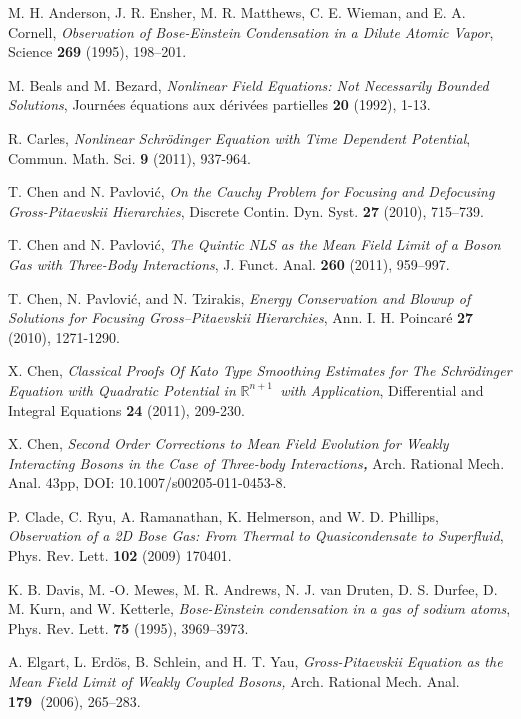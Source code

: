 \documentclass[reqno]{amsart}
\theoremstyle{plain}
\numberwithin{equation}{section}
\begin{document}
\begin{thebibliography}{99}
 M. H. Anderson, J. R. Ensher, M. R. Matthews, C. E.
Wieman, and E. A. Cornell, \emph{Observation of Bose-Einstein Condensation
in a Dilute Atomic Vapor}, Science \textbf{269 }(1995), 198--201.

 M. Beals and M. Bezard, \emph{Nonlinear Field
Equations: Not Necessarily Bounded Solutions}, Journ\'{e}es \'{e}quations
aux d\'{e}riv\'{e}es partielles \textbf{20} (1992), 1-13.

 R. Carles, \emph{Nonlinear Schr\"{o}dinger Equation with
Time Dependent Potential}, Commun. Math. Sci. \textbf{9} (2011), 937-964.

 T. Chen and N. Pavlovi\'{c}, \emph{On the Cauchy
Problem for Focusing and Defocusing Gross-Pitaevskii Hierarchies}, Discrete
Contin. Dyn. Syst. \textbf{27} (2010), 715--739.

 T. Chen and N. Pavlovi\'{c}, \emph{The Quintic NLS as
the Mean Field Limit of a Boson Gas with Three-Body Interactions}, J. Funct.
Anal. \textbf{260} (2011), 959--997.

 T. Chen, N. Pavlovi\'{c}, and N. Tzirakis, \emph{Energy
Conservation and Blowup of Solutions for Focusing Gross--Pitaevskii
Hierarchies}, Ann. I. H. Poincar\'{e} \textbf{27} (2010), 1271-1290.

 X. Chen, \emph{Classical Proofs Of Kato Type Smoothing
Estimates for The Schr\"{o}dinger Equation with Quadratic Potential in }$\mathbb{R}^{n+1}$\emph{\ with Application}, Differential and Integral
Equations \textbf{24} (2011), 209-230.

 X. Chen, \emph{Second Order Corrections to Mean Field
Evolution for Weakly Interacting Bosons in the Case of Three-body
Interactions\textbf{,} }Arch. Rational Mech. Anal. 43pp, DOI:
10.1007/s00205-011-0453-8.

 P. Clade, C. Ryu, A. Ramanathan, K. Helmerson, and W. D.
Phillips, \emph{Observation of a 2D Bose Gas: From Thermal to
Quasicondensate to Superfluid}, Phys. Rev. Lett. \textbf{102} (2009) 170401.

 K. B. Davis, M. -O. Mewes, M. R. Andrews, N. J. van Druten,
D. S. Durfee, D. M. Kurn, and W. Ketterle, \emph{Bose-Einstein condensation
in a gas of sodium atoms}, Phys. Rev. Lett. \textbf{75 }(1995), 3969--3973.

 A. Elgart, L. Erd\"{o}s, B. Schlein, and H. T. Yau, \emph{Gross-Pitaevskii Equation as the Mean Field Limit of Weakly Coupled Bosons,}
Arch. Rational Mech. Anal. \textbf{179\ }(2006), 265--283.


\end{thebibliography}
\end{document}
